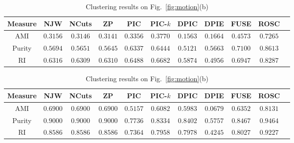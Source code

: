 {\begin{table}[!htbp]
\centering
\caption{Clustering results on Fig.~\ref{fig:motion}(a)}
\label{table:motion1}
\resizebox{0.8\linewidth}{!}
{
\begin{tabular}{|c|c|c|c|c|c|c|c|c|c|c|} \hline
Measure &NJW & NCuts & ZP & PIC & PIC-$k$ & DPIC & DPIE & FUSE & ROSC \\ \hline 
AMI    & $0.3156$ & $0.3146$ & $0.3141$ & $0.3356$ & $0.3770$ & $0.1563$ & $0.1664$ & $0.4573$ & $\bm{0.7265}$ \\ \hline
Purity & $0.5694$ & $0.5651$ & $0.5645$ & $0.6337$ & $0.6444$ & $0.5121$ & $0.5663$ & $0.7100$ & $\bm{0.8613}$ \\ \hline
RI       & $0.6316$ & $0.6309$ & $0.6310$ & $0.6488$ & $0.6682$ & $0.5874$ & $0.4956$ & $0.6947$ & $\bm{0.8287}$ \\ \hline
\end{tabular}
}
\caption{Clustering results on Fig.~\ref{fig:motion}(b)}
\label{table:motion2}
\resizebox{0.8\linewidth}{!}
{
\begin{tabular}{|c|c|c|c|c|c|c|c|c|c|c|} \hline
Measure &NJW & NCuts & ZP & PIC & PIC-$k$ & DPIC & DPIE & FUSE & ROSC \\ \hline 
AMI    & $0.6900$ & $0.6900$ & $0.6900$ & $0.5157$ & $0.6082$ & $0.5983$ & $0.0679$ & $0.6352$ & $\bm{0.8131}$ \\ \hline
Purity & $0.9000$ & $0.9000$ & $0.9000$ & $0.7736$ & $0.8334$ & $0.8402$ & $0.5757$ & $0.8467$ & $\bm{0.9464}$ \\ \hline
RI       & $0.8586$ & $0.8586$ & $0.8586$ & $0.7364$ & $0.7958$ & $0.7978$ & $0.4245$ & $0.8027$ & $\bm{0.9227}$ \\ \hline
\end{tabular}
}
\end{table}
}
